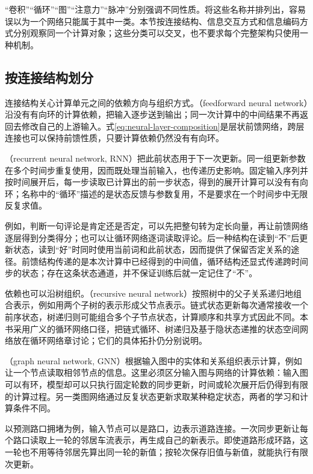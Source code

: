 “卷积”“循环”“图”“注意力”“脉冲”分别强调不同性质。将这些名称并排列出，容易误以为一个网络只能属于其中一类。本节按连接结构、信息交互方式和信息编码方式分别观察同一个计算对象；这些分类可以交叉，也不要求每个完整架构只使用一种机制。

\subsection{按连接结构划分}
\label{sec:neural-types-connectivity}

连接结构关心计算单元之间的依赖方向与组织方式。（feedforward neural network）沿没有有向环的计算依赖，把输入逐步送到输出；同一次计算中的中间结果不再返回去修改自己的上游输入。式\eqref{eq:neural-layer-composition}是层状前馈网络，跨层连接也可以保持前馈性质，只要计算依赖仍然没有有向环。

（recurrent neural network, RNN）把此前状态用于下一次更新。同一组更新参数在多个时间步重复使用，因而既处理当前输入，也传递历史影响。固定输入序列并按时间展开后，每一步读取已计算出的前一步状态，得到的展开计算可以没有有向环；名称中的“循环”描述的是状态反馈与参数复用，不是要求在一个时间步中无限反复求值。

例如，判断一句评论是肯定还是否定，可以先把整句转为定长向量，再让前馈网络逐层得到分类得分；也可以让循环网络逐词读取评论。后一种结构在读到“不”后更新状态，读到“好”时同时使用当前词和此前状态，因而提供了保留否定关系的途径。前馈结构传递的是本次计算中已经得到的中间值，循环结构还显式传递跨时间步的状态；存在这条状态通道，并不保证训练后就一定记住了“不”。

依赖也可以沿树组织。（recursive neural network）按照树中的父子关系递归地组合表示，例如用两个子树的表示形成父节点表示。链式状态更新每次通常接收一个前序状态，树递归则可能组合多个子节点状态，计算顺序和共享方式因此不同。本书采用广义的循环网络口径，把链式循环、树递归及基于隐状态递推的状态空间网络放在循环网络章讨论；它们的具体拓扑仍分别说明。

（graph neural network, GNN）根据输入图中的实体和关系组织表示计算，例如让一个节点读取相邻节点的信息。这里必须区分输入图与网络的计算依赖：输入图可以有环，模型却可以只执行固定轮数的同步更新，时间或轮次展开后仍得到有限的计算过程。另一类图网络通过反复状态更新求取某种稳定状态，两者的学习和计算条件不同。

以预测路口拥堵为例，输入节点可以是路口，边表示道路连接。一次同步更新让每个路口读取上一轮的邻居车流表示，再生成自己的新表示。即使道路形成环路，这一轮也不用等待邻居先算出同一轮的新值；按轮次保存旧值与新值，就能执行有限次更新。

